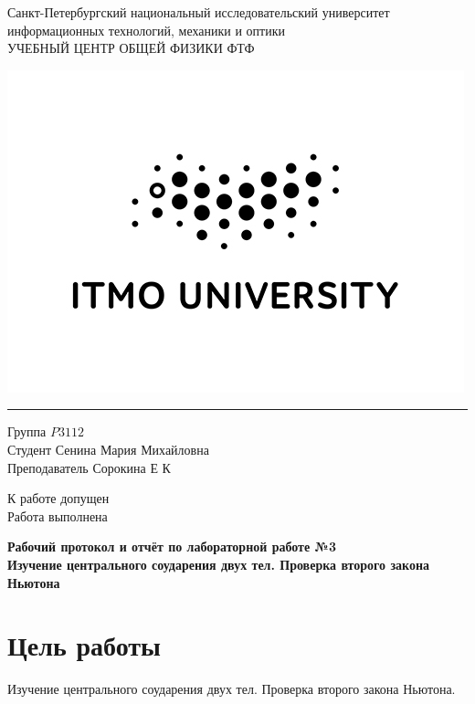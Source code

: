 \documentclass[20pt]{article}
\begin{document}
\begin{minipage}{0.8\textwidth}
\begin{center}
    \large{Санкт-Петербургский национальный исследовательский университет информационных технологий, механики и оптики
\\УЧЕБНЫЙ ЦЕНТР ОБЩЕЙ ФИЗИКИ ФТФ}
\medbreak
\end{center}
\end{minipage}
\hfill
\begin{minipage}{0.3\textwidth}
\includegraphics[scale=0.4]{itmo.jpg}
\end{minipage}

\noindent\rule{\textwidth}{1pt}
\medbreak
\begin{minipage}{0.5\textwidth}
Группа $\textit{P3112}$						
\\Студент $\textit{Сенина Мария Михайловна}$			
\\Преподаватель $\textit{Сорокина Е К}$
\end{minipage}
\hfill
\begin{minipage}{0.4\textwidth}
К работе допущен
\\Работа выполнена
\end{minipage}

\bigbreak

\begin{center}
        \Large{\textbf{Рабочий протокол и отчёт по лабораторной работе №3}}
   \LARGE{\textbf{\\ Изучение центрального соударения двух тел. Проверка второго закона Ньютона}}
\end{center}

\section{Цель работы}
Изучение центрального соударения двух тел. Проверка второго
закона Ньютона.
\end{document}
